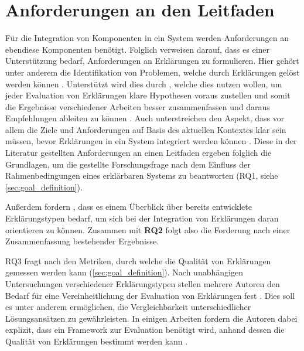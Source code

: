 \section{Anforderungen an den Leitfaden}

Für die Integration von Komponenten in ein System werden Anforderungen an ebendiese Komponenten benötigt. Folglich verweisen \citeauthor{chazette_end-users_nodate} darauf, dass es einer Unterstützung bedarf, Anforderungen an Erklärungen zu formulieren. Hier gehört unter anderem die Identifikation von Problemen, welche durch Erklärungen gelöst werden können \cite{chazette_end-users_nodate, doshi2017towards}. Unterstützt wird dies durch \citeauthor{waa_evaluating_2021}, welche dies nutzen wollen, um jeder Evaluation von Erklärungen klare Hypothesen voraus zustellen und somit die Ergebnisse verschiedener Arbeiten besser zusammenfassen und daraus Empfehlungen ableiten zu können \cite{waa_evaluating_2021}. Auch \citeauthor{kohl_explainability_2019} unterstreichen den Aspekt, dass vor allem die Ziele und Anforderungen auf Basis des aktuellen Kontextes klar sein müssen, bevor Erklärungen in ein System integriert werden können \cite{kohl_explainability_2019}. Diese in der Literatur gestellten Anforderungen an einen Leitfaden ergeben folglich die Grundlagen, um die gestellte Forschungsfrage nach dem Einfluss der Rahmenbedingungen eines erklärbaren Systems zu beantworten (RQ1, siehe \autoref{sec:goal_definition}).

Außerdem fordern \citeauthor{waa_evaluating_2021}, dass es einem Überblick über bereits entwicklete Erklärungstypen bedarf, um sich bei der Integration von Erklärungen daran orientieren zu können. Zusammen mit \textbf{RQ2} folgt also die Forderung nach einer Zusammenfassung bestehender Ergebnisse.

RQ3 fragt nach den Metriken, durch welche die Qualität von Erklärungen gemessen werden kann (\autoref{sec:goal_definition}). Nach unabhängigen Untersuchungen verschiedener Erklärungstypen stellen mehrere Autoren den Bedarf für eine Vereinheitlichung der Evaluation von Erklärungen fest \cite{cirqueira_scenario-based_2020,zahedi_towards_2019, nunes_systematic_2017, martin_evaluating_2021}. Dies soll es unter anderem ermöglichen, die Vergleichbarkeit unterschiedlicher Lösungsansätzen zu gewährleisten. In einigen Arbeiten fordern die Autoren dabei explizit, dass ein Framework zur Evaluation benötigt wird, anhand dessen die Qualität von Erklärungen bestimmt werden kann \cite{nunes_systematic_2017,sokol_explainability_2020,chari_explanation_2020}.

